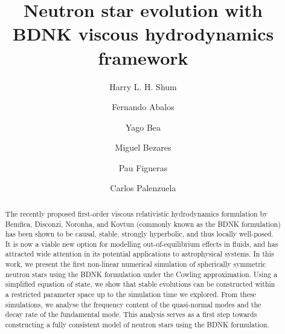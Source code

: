 \documentclass[prd,aps,twocolumn,floats,floatfix,nofootinbib,superscriptaddress] {revtex4-1}
\begin{document}
\title{ Neutron star evolution with BDNK viscous hydrodynamics framework}


\author{ Harry L. H. Shum}
\address{Nottingham Centre of Gravity, University of Nottingham, Nottingham NG7 2RD, UK}
\address{School of Mathematical Sciences, University of Nottingham, Nottingham, NG7 2RD, UK}
%
\author{Fernando Abalos}
\address{Departament de F\'isica, Universitat de les Illes Balears, Palma de Mallorca, E-07122, Spain }
\address{Institute of Applied Computing $\&$ Community Code (IAC3), Universitat de les Illes Balears, Palma de Mallorca, E-07122, Spain } 
% 
\author{Yago Bea}
\address{Departament de Física Quàntica i Astrofísica and Institut de Ciències del Cosmos (ICC), Universitat de Barcelona, Martí i Franquès 1, ES-08028, Barcelona, Spain}
%
\author{Miguel Bezares}
\address{Nottingham Centre of Gravity, University of Nottingham, Nottingham NG7 2RD, UK}
\address{School of Mathematical Sciences, University of Nottingham, Nottingham, NG7 2RD, UK}
\author{Pau Figueras}
\address{School of Mathematical Sciences, Queen Mary University of London,
 Mile End Road, London E1 4NS, United Kingdom}
% 
\author{Carlos Palenzuela}
\address{Departament de F\'isica, Universitat de les Illes Balears, Palma de Mallorca, E-07122, Spain }
\address{Institute of Applied Computing $\&$ Community Code (IAC3), Universitat de les Illes Balears, Palma de Mallorca, E-07122, Spain } 


\begin{abstract}
The recently proposed first-order viscous relativistic hydrodynamics formulation by Bemfica, Disconzi, Noronha, and Kovtun (commonly known as the BDNK formulation) has been shown to be causal, stable, strongly hyperbolic, and thus locally well-posed. It is now a viable new option for modelling out-of-equilibrium effects in fluids, and has attracted wide attention in its potential applications to astrophysical systems.
In this work, we present the first non-linear numerical simulation of spherically symmetric neutron stars using the BDNK formulation under the Cowling approximation.  Using a simplified equation of state, we show that stable evolutions can be constructed within a restricted parameter space up to the simulation time we explored.  From these simulations, we analyse the frequency content of the quasi-normal modes and the decay rate of the fundamental mode.  This analysis serves as a first step towards constructing a fully consistent model of neutron stars using the BDNK formulation.
\end{abstract}
\end{document}
